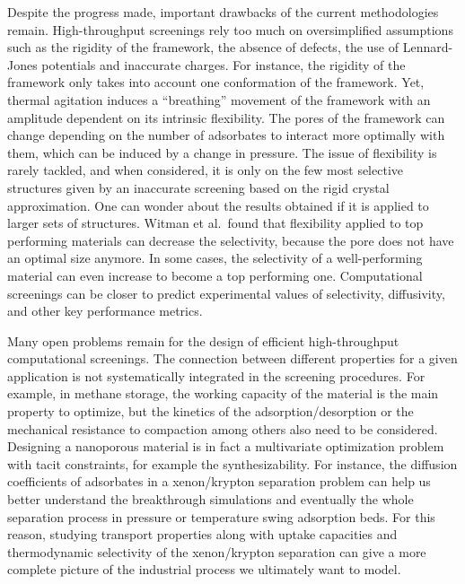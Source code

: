 \documentclass[main.tex]{subfiles}
\begin{document}
Despite the progress made, important drawbacks of the current methodologies remain. High-throughput screenings rely too much on oversimplified assumptions such as the rigidity of the framework, the absence of defects, the use of Lennard-Jones potentials and inaccurate charges. For instance, the rigidity of the framework only takes into account one conformation of the framework. Yet, thermal agitation induces a ``breathing'' movement of the framework with an amplitude dependent on its intrinsic flexibility. The pores of the framework can change depending on the number of adsorbates to interact more optimally with them, which can be induced by a change in pressure. The issue of flexibility is rarely tackled, and when considered, it is only on the few most selective structures given by an inaccurate screening based on the rigid crystal approximation. One can wonder about the results obtained if it is applied to larger sets of structures. Witman et al.\ found that flexibility applied to top performing materials can decrease the selectivity, because the pore does not have an optimal size anymore.\cite{Witman_2017} In some cases, the selectivity of a well-performing material can even increase to become a top performing one. Computational screenings can be closer to predict experimental values of selectivity, diffusivity, and other key performance metrics.

Many open problems remain for the design of efficient high-throughput computational screenings. The connection between different properties for a given application is not systematically integrated in the screening procedures. For example, in methane storage, the working capacity of the material is the main property to optimize, but the kinetics of the adsorption/desorption or the mechanical resistance to compaction among others also need to be considered. Designing a nanoporous material is in fact a multivariate optimization problem with tacit constraints, for example the {synthesizability}. For instance, the diffusion coefficients of adsorbates in a xenon/krypton separation problem can help us better understand the breakthrough simulations and eventually the whole separation process in pressure or temperature swing adsorption beds. For this reason, studying transport properties along with uptake capacities and thermodynamic selectivity of the xenon/krypton separation can give a more complete picture of the industrial process we ultimately want to model. 
\end{document}
